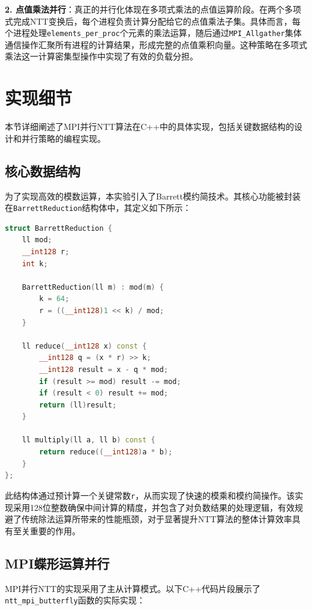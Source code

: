\documentclass[a4paper]{article}
\begin{document}
\textbf{2. 点值乘法并行}：真正的并行化体现在多项式乘法的点值运算阶段。在两个多项式完成NTT变换后，每个进程负责计算分配给它的点值乘法子集。具体而言，每个进程处理\texttt{elements\_per\_proc}个元素的乘法运算，随后通过\texttt{MPI\_Allgather}集体通信操作汇聚所有进程的计算结果，形成完整的点值乘积向量。这种策略在多项式乘法这一计算密集型操作中实现了有效的负载分担。

\section{实现细节}

本节详细阐述了MPI并行NTT算法在C++中的具体实现，包括关键数据结构的设计和并行策略的编程实现。

\subsection{核心数据结构}

为了实现高效的模数运算，本实验引入了Barrett模约简技术。其核心功能被封装在\texttt{BarrettReduction}结构体中，其定义如下所示：

\begin{lstlisting}[title=Barrett规约结构,frame=trbl,language={C++}]
struct BarrettReduction {
    ll mod;
    __int128 r;
    int k;
    
    BarrettReduction(ll m) : mod(m) {
        k = 64;
        r = ((__int128)1 << k) / mod;
    }
    
    ll reduce(__int128 x) const {
        __int128 q = (x * r) >> k;
        __int128 result = x - q * mod;
        if (result >= mod) result -= mod;
        if (result < 0) result += mod;
        return (ll)result;
    }
    
    ll multiply(ll a, ll b) const {
        return reduce((__int128)a * b);
    }
};
\end{lstlisting}
此结构体通过预计算一个关键常数\texttt{r}，从而实现了快速的模乘和模约简操作。该实现采用128位整数确保中间计算的精度，并包含了对负数结果的处理逻辑，有效规避了传统除法运算所带来的性能瓶颈，对于显著提升NTT算法的整体计算效率具有至关重要的作用。

\subsection{MPI蝶形运算并行}

MPI并行NTT的实现采用了主从计算模式。以下C++代码片段展示了\texttt{ntt\_mpi\_butterfly}函数的实际实现：
\end{document}
